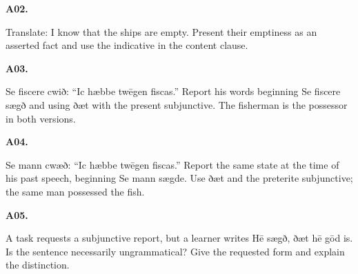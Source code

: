 \par\begin{minipage}{\linewidth}\raggedright
\textbf{A02.}

Translate: I know that the ships are empty. Present their emptiness as an asserted fact and use the indicative in the content clause.

\end{minipage}\par\addvspace{4pt}

\par\begin{minipage}{\linewidth}\raggedright
\textbf{A03.}

Se fiscere cwið: “Ic hæbbe twēgen fiscas.” Report his words beginning Se fiscere sægð and using ðæt with the present subjunctive. The fisherman is the possessor in both versions.

\end{minipage}\par\addvspace{4pt}

\par\begin{minipage}{\linewidth}\raggedright
\textbf{A04.}

Se mann cwæð: “Ic hæbbe twēgen fiscas.” Report the same state at the time of his past speech, beginning Se mann sægde. Use ðæt and the preterite subjunctive; the same man possessed the fish.

\end{minipage}\par\addvspace{4pt}

\par\begin{minipage}{\linewidth}\raggedright
\textbf{A05.}

A task requests a subjunctive report, but a learner writes Hē sægð, ðæt hē gōd is. Is the sentence necessarily ungrammatical? Give the requested form and explain the distinction.

\end{minipage}\par\addvspace{4pt}


